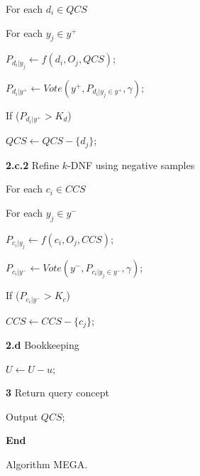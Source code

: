 \begin{figure}[htbp]
\begin{nlist}
\begin{nlist}
\begin{nlist}
   \begin{nlist}
   \item For each $d_i \in QCS$
    \begin{nlist}
     \item For each $y_j \in y^+$
     \begin{nlist}
     \item $P_{d_i|y_j} \leftarrow f(d_i, O_j, QCS)$;
     \end{nlist}
    \item $P_{d_i|y^+} \leftarrow Vote(y^+, P_{d_i | y_j \in y^+}, \gamma)$;
    \item If ($P_{d_i|y^+} > K_d$)
     \begin{nlist}
     \item $QCS \leftarrow QCS - \{d_j\}$;
     \end{nlist}
    \end{nlist}
   \end{nlist}

   \item {\bf 2.c.2} Refine $k$-DNF using negative samples
   \begin{nlist}
   \item For each $c_i \in CCS$
    \begin{nlist}
     \item For each $y_j \in y^-$
     \begin{nlist}
     \item $P_{c_i|y_j} \leftarrow f(c_i, O_j, CCS)$;
     \end{nlist}
    \item $P_{c_i|y^-} \leftarrow Vote(y^-, P_{c_i | y_j \in y^-}, \gamma)$;
    \item If ($P_{c_i|y^-} > K_c$)
     \begin{nlist}
     \item $CCS \leftarrow CCS - \{c_j\}$;
     \end{nlist}
    \end{nlist}
   \end{nlist}
  \end{nlist}

  \item {\bf 2.d} Bookkeeping
   \begin{nlist}
   \item $U \leftarrow U - u$;
   \end{nlist}
\end{nlist}

\item {\bf 3} Return query concept
\begin{nlist}
  \item Output $QCS$; 
\end{nlist}
\item {\bf End}
\end{nlist}  
\caption{Algorithm MEGA.}
\label{fig-learner}
\end{figure}

